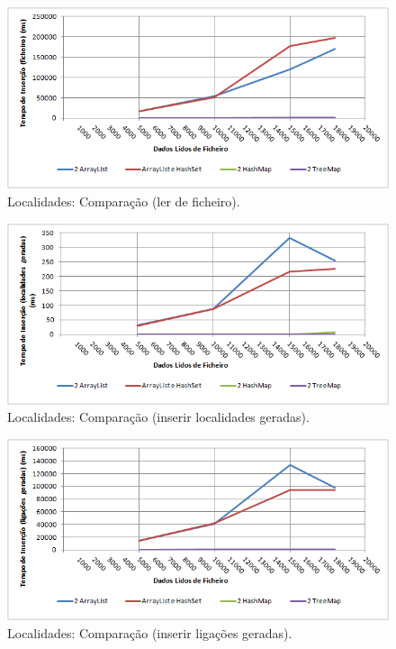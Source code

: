 \documentclass[a5paper,twocolumn, 11pt]{article}
\begin{document}
\clearpage
\onecolumn
\begin{figure}[h!b!t!]
    \caption[Localidades: Comparação (ler de ficheiro)]{Localidades: Comparação (ler de ficheiro).}
    \label{hashtable}
    \centering
        \includegraphics[width=400pt]{cloc_o1.png}
\end{figure}
\begin{figure}[h!b!t!]
    \caption[Localidades: Comparação (inserir localidades geradas)]{Localidades: Comparação (inserir localidades geradas).}
    \label{hashtable}
    \centering
        \includegraphics[width=400pt]{cloc_o2.png}
\end{figure}
\begin{figure}[h!b!t!]
    \caption[Localidades: Comparação (inserir ligações geradas)]{Localidades: Comparação (inserir ligações geradas).}
    \label{hashtable}
    \centering
        \includegraphics[width=400pt]{cloc_o3.png}
\end{figure}
\end{document}
